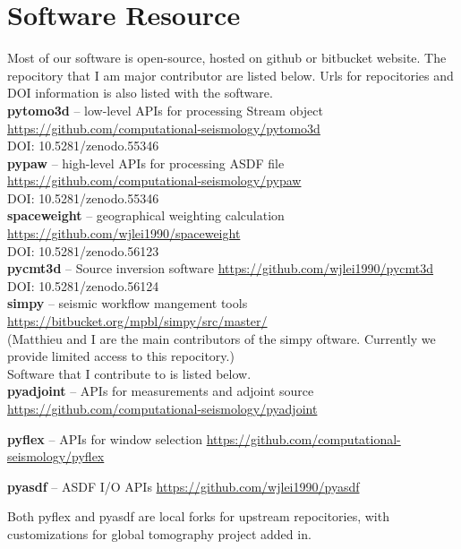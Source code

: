 \chapter{Software Resource\label{ch:implementation}}
\label{ch:software_resource}

Most of our software is open-source, hosted on github or bitbucket website.
The repocitory that I am major contributor are listed below. Urls for
repocitories and DOI information is also listed with the software.\\

\noindent \textbf{pytomo3d} -- low-level APIs for processing Stream object\\
\url{https://github.com/computational-seismology/pytomo3d}\\
DOI: 10.5281/zenodo.55346\\

\noindent \textbf{pypaw} -- high-level APIs for processing ASDF file\\
\url{https://github.com/computational-seismology/pypaw}\\
DOI: 10.5281/zenodo.55346\\

\noindent \textbf{spaceweight} -- geographical weighting calculation\\
\url{https://github.com/wjlei1990/spaceweight}\\
DOI: 10.5281/zenodo.56123\\

\noindent \textbf{pycmt3d} -- Source inversion software
\url{https://github.com/wjlei1990/pycmt3d}\\
DOI: 10.5281/zenodo.56124\\

\noindent \textbf{simpy} -- seismic workflow mangement tools\\
\url{https://bitbucket.org/mpbl/simpy/src/master/}\\
(Matthieu and I are the main contributors of the simpy oftware.
Currently we provide limited access to this repocitory.)\\

Software that I contribute to is listed below.\\

\noindent \textbf{pyadjoint} -- APIs for measurements and adjoint source
\url{https://github.com/computational-seismology/pyadjoint}

\noindent \textbf{pyflex} -- APIs for window selection
\url{https://github.com/computational-seismology/pyflex}

\noindent \textbf{pyasdf} -- ASDF I/O APIs
\url{https://github.com/wjlei1990/pyasdf}

Both pyflex and pyasdf are local forks for upstream repocitories,
with customizations for global tomography project added in.

